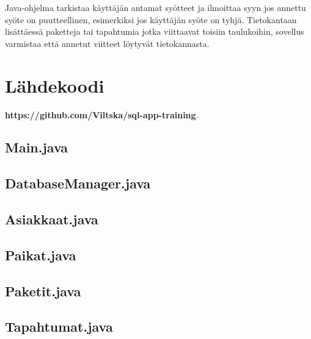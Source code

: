 \documentclass[11pt,a4paper]{article}
\begin{document}
Java-ohjelma tarkistaa käyttäjän antamat syötteet ja ilmoittaa syyn jos annettu syöte on puutteellinen, esimerkiksi jos käyttäjän syöte on tyhjä. Tietokantaan lisättäessä paketteja tai tapahtumia jotka viittaavat toisiin taulukoihin, sovellus varmistaa että annetut viitteet löytyvät tietokannasta.

\newpage
\section{Lähdekoodi}
\textbf{https://github.com/Viltska/sql-app-training}.

\subsection*{Main.java}

\subsection*{DatabaseManager.java}

\subsection*{Asiakkaat.java}

\subsection*{Paikat.java}

\subsection*{Paketit.java}

\subsection*{Tapahtumat.java}

\end{document}
